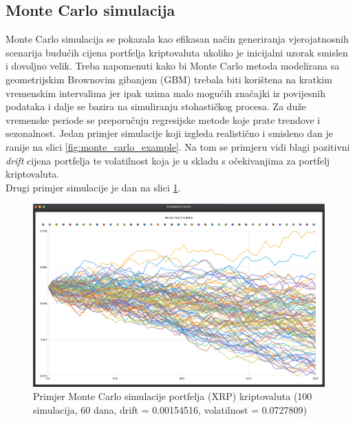 \documentclass[zavrsnirad, upload]{fer}
\begin{document}
\subsection{Monte Carlo simulacija}
\label{sek:monte_carlo_rezultati}
Monte Carlo simulacija se pokazala kao efikasan način
generiranja vjerojatnosnih scenarija budućih cijena portfelja kriptovaluta
ukoliko je inicijalni uzorak smislen i dovoljno velik.
Treba napomenuti kako bi Monte Carlo metoda modelirana sa
geometrijskim Brownovim gibanjem (GBM) trebala biti korištena
na kratkim vremenskim intervalima jer ipak uzima malo mogućih
značajki iz povijesnih podataka i dalje se bazira na simuliranju
stohastičkog procesa. Za duže vremenske periode se preporučuju
regresijske metode koje prate trendove i sezonalnost.
Jedan primjer simulacije koji izgleda realistično i smisleno
dan je ranije na slici \ref{fig:monte_carlo_example}.
Na tom se primjeru vidi blagi pozitivni \textit{drift} cijena portfelja
te volatilnost koja je u skladu s očekivanjima za portfelj kriptovaluta.
\\
Drugi primjer simulacije je dan na slici \ref{fig:monte_carlo_example2}.
\begin{figure}[H]
    \centering
    \includegraphics[width=1.0\textwidth]{Figures/monte_carlo_example2.png}
    \caption{Primjer Monte Carlo simulacije portfelja (XRP) kriptovaluta (100
    simulacija, 60 dana, drift = 0.00154516, volatilnost = 0.0727809)}
    \label{fig:monte_carlo_example2}
\end{figure}
\end{document}
